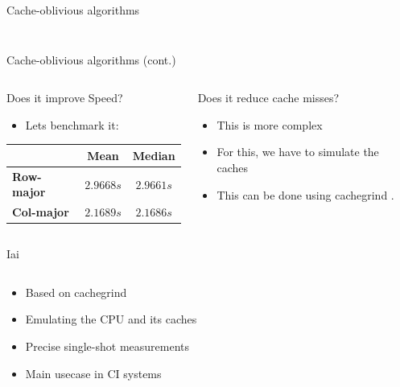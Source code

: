 \documentclass[compress,aspectratio=169]{beamer}
\begin{document}
\begin{frame}{Cache-oblivious algorithms \cite{frigo}}
\begin{columns}
\begin{column}{0.5\textwidth}
      \cite{cmglee}
    \end{column}
  \end{columns}
\end{frame}

\begin{frame}{Cache-oblivious algorithms (cont.)}
  \begin{columns}
    \begin{column}{0.5\textwidth}
      \begin{block}{Does it improve Speed?}
        \begin{itemize}
          \item Lets benchmark it:
        \end{itemize}
  \begin{table}[h]
\begin{tabular}{|l|c|c|}
\hline
    & \textbf{Mean} & \textbf{Median}\\
\hline
    \textbf{Row-major} & $2.9668s$ & $2.9661 s$\\
  \hline
    \textbf{Col-major} & $2.1689 s$ & $2.1686 s$\\
\hline
\end{tabular}
\end{table}
      \end{block}
    \end{column}
    \pause
    \begin{column}{0.5\textwidth}
      \begin{block}{Does it reduce cache misses?}
        \begin{itemize}
          \item This is more complex
          \item For this, we have to simulate the caches
          \item This can be done using cachegrind \cite{valgrind}.
        \end{itemize}
      \end{block}
    \end{column}
  \end{columns}
\end{frame}

\begin{frame}{Iai \cite{iai}}
  \begin{columns}
    \begin{column}{0.5\textwidth}
  \begin{itemize}
    \item Based on cachegrind
    \item Emulating the CPU and its caches
    \item Precise single-shot measurements
    \item Main usecase in CI systems
  \end{itemize}
    \end{column}
    \pause
    \begin{column}{0.5\textwidth}
    \footnotesize\inputminted[xleftmargin=1em,linenos]{text}{./assets/iai.txt}
    \end{column}
  \end{columns}
\end{frame}
\end{document}
